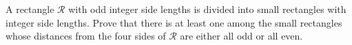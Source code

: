 A rectangle 
$\mathcal{R}$
 with odd integer side lengths is divided into small rectangles with integer side lengths. Prove that there is at least one among the small rectangles whose distances from the four sides of 
$\mathcal{R}$
 are either all odd or all even.
